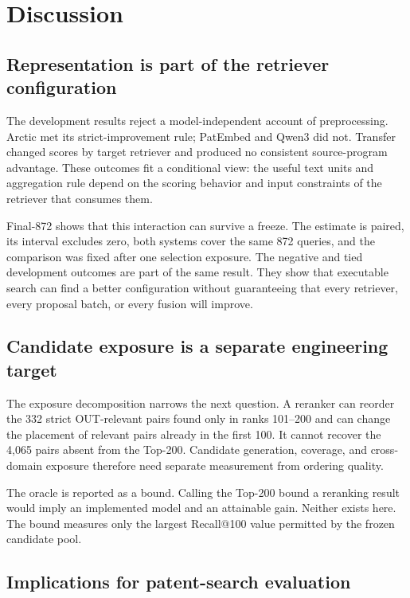 \documentclass[final,5p,times,twocolumn]{elsarticle}
\begin{document}
\section{Discussion}

\subsection{Representation is part of the retriever configuration}

The development results reject a model-independent account of preprocessing.
Arctic met its strict-improvement rule; PatEmbed and Qwen3 did not. Transfer
changed scores by target retriever and produced no consistent source-program
advantage. These outcomes fit a conditional view: the useful text units and
aggregation rule depend on the scoring behavior and input constraints of the
retriever that consumes them.

Final-872 shows that this interaction can survive a freeze. The estimate is
paired, its interval excludes zero, both systems cover the same 872 queries,
and the comparison was fixed after one selection exposure. The negative and
tied development outcomes are part of the same result. They show that
executable search can find a better configuration without guaranteeing that
every retriever, every proposal batch, or every fusion will improve.

\subsection{Candidate exposure is a separate engineering target}

The exposure decomposition narrows the next question. A reranker can reorder the
332 strict OUT-relevant pairs found only in ranks 101--200 and can change the
placement of relevant pairs already in the first 100. It cannot recover the
4,065 pairs absent from the Top-200. Candidate generation, coverage, and
cross-domain exposure therefore need separate measurement from ordering
quality.

The oracle is reported as a bound. Calling the Top-200 bound a reranking result
would imply an implemented model and an
attainable gain. Neither exists here. The bound measures only the largest
Recall@100 value permitted by the frozen candidate pool.

\subsection{Implications for patent-search evaluation}
\end{document}

